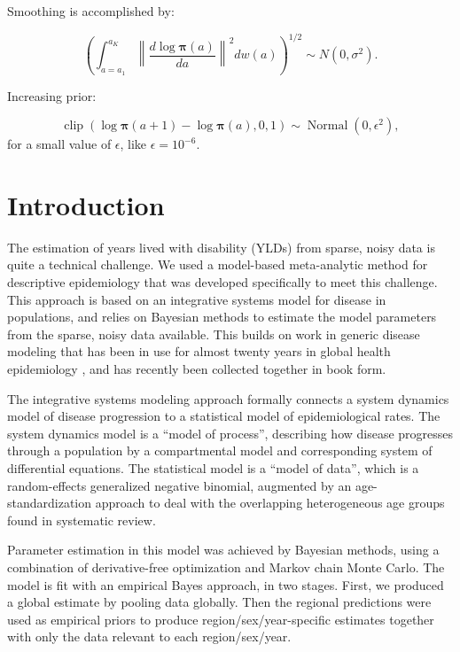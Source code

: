 \documentclass[12pt]{article}
\newcommand{\1}{\mathbf{1}}
\newcommand{\0}{\mathbf{0}}
\newcommand{\Normal}{\operatorname{Normal}}
\def\boldpi{{\boldsymbol{\pi}}}
\begin{document}
Smoothing is accomplished by:

\[
\left(\int _{a=a_1} ^{a_K} \left\| \frac{d \log \boldpi (a)}{da} \right\|^2 dw(a)\right)^{1/2} \sim N(0, \sigma^2).
\]


Increasing prior:

\[
\operatorname{clip}(\log \boldpi(a+1) - \log \boldpi(a), 0, 1) \sim \Normal(0, \epsilon^2),
\]
for a small value of $\epsilon$, like $\epsilon = 10^{-6}$.


\section{Introduction}
The estimation of years lived with disability (YLDs) from sparse,
noisy data is quite a technical challenge.  We used a model-based
meta-analytic method for descriptive epidemiology that was developed
specifically to meet this challenge.  This approach is based on an
integrative systems model for disease in populations, and relies on
Bayesian methods to estimate the model parameters from the sparse,
noisy data available.  This builds on work in generic disease modeling
that has been in use for almost twenty years in global health
epidemiology \cite{Barendregt_Generic_2003}, and has recently been
collected together in book form.

The integrative systems modeling approach formally connects a system
dynamics model of disease progression to a statistical model of
epidemiological rates.  The system dynamics model is a ``model of
process'', describing how disease progresses through a population by a
compartmental model and corresponding system of differential
equations.  The statistical model is a ``model of data'', which is a
random-effects generalized negative binomial, augmented by an
age-standardization approach to deal with the overlapping
heterogeneous age groups found in systematic review.

Parameter estimation in this model was achieved by Bayesian methods,
using a combination of derivative-free optimization and Markov chain
Monte Carlo.  The model is fit with an empirical Bayes approach, in
two stages.  First, we produced a global estimate by pooling data
globally.  Then the regional predictions were used as empirical priors
to produce region/sex/year-specific estimates together with only the
data relevant to each region/sex/year.
\end{document}
